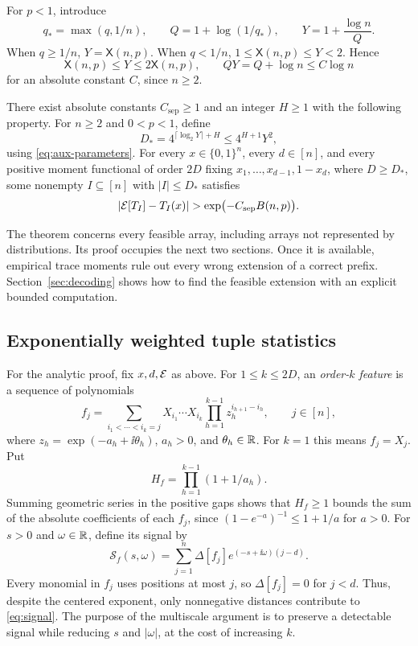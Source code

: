 For $p<1$, introduce
\begin{equation}\label{eq:aux-parameters}
 q_* =\max(q,1/n),\qquad
 Q=1+\log(1/q_*),\qquad
 Y=1+\frac{\log n}{Q}.
\end{equation}
When $q\ge1/n$, $Y=\mathsf X(n,p)$. When $q<1/n$,
$1\le\mathsf X(n,p)\le Y<2$. Hence
\[
 \mathsf X(n,p)\le Y\le2\mathsf X(n,p),\qquad
 QY=Q+\log n\le C\log n
\]
for an absolute constant $C$, since $n\ge2$.

\begin{theorem}\label{thm:separation}
There exist absolute constants $C_{\mathrm{sep}}\ge1$ and an integer
$H\ge1$ with the following property. For $n\ge2$ and $0<p<1$, define
\[
 D_*=4^{\lceil\log_2 Y\rceil+H}\le4^{H+1}Y^2,
\]
using \eqref{eq:aux-parameters}. For every $x\in\{0,1\}^n$, every
$d\in[n]$, and every positive moment functional of order $2D$ fixing
$x_1,\ldots,x_{d-1},1-x_d$, where $D\ge D_*$, some nonempty
$I\subseteq[n]$ with $|I|\le D_*$ satisfies
\[
 |\EE[T_I]-T_I(x)|>
       \exp\bigl(-C_{\mathrm{sep}}B(n,p)\bigr).
\]
\end{theorem}

The theorem concerns every feasible array, including arrays not
represented by distributions. Its proof occupies the next two sections.
Once it is available, empirical trace moments rule out every wrong
extension of a correct prefix. Section~\ref{sec:decoding} shows how to
find the feasible extension with an explicit bounded computation.

\subsection{Exponentially weighted tuple statistics}
For the analytic proof, fix $x,d,\mathcal E$ as above. For $1\le k\le2D$,
an \emph{order-$k$ feature}
is a sequence of polynomials
\begin{equation}\label{eq:feature}
 f_j=\sum_{i_1<\cdots<i_k=j}
       X_{i_1}\cdots X_{i_k}
       \prod_{h=1}^{k-1}z_h^{i_{h+1}-i_h},
 \qquad j\in[n],
\end{equation}
where $z_h=\exp(-a_h+\ii\theta_h)$, $a_h>0$, and $\theta_h\in\mathbb R$.
For $k=1$ this means $f_j=X_j$. Put
\[
 H_f=\prod_{h=1}^{k-1}(1+1/a_h).
\]
Summing geometric series in the positive gaps shows that $H_f\ge1$
bounds the sum of the absolute coefficients of each $f_j$, since
$(1-e^{-a})^{-1}\le1+1/a$ for $a>0$.
For $s>0$ and $\omega\in\mathbb R$, define its signal by
\begin{equation}\label{eq:signal}
 \mathcal S_f(s,\omega)=
 \sum_{j=1}^n\Delta[f_j]e^{(-s+\ii\omega)(j-d)}.
\end{equation}
Every monomial in $f_j$ uses positions at most $j$, so
$\Delta[f_j]=0$ for $j<d$. Thus, despite the centered exponent,
only nonnegative distances contribute to \eqref{eq:signal}.
The purpose of the multiscale argument is to preserve a detectable
signal while reducing $s$ and $|\omega|$, at the cost of increasing $k$.
